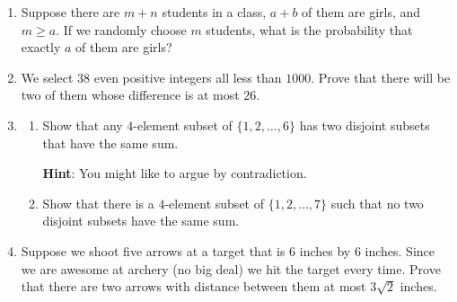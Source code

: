 \documentclass[11pt]{article}
\begin{document}
\begin{enumerate}
\item Suppose there are $m+n$ students in a class, $a+b$ of them are girls, and $m \ge a$.  If we randomly choose $m$ students, what is the probability that exactly $a$ of them are girls?

\item We select $38$ even positive integers all less than $1000$.  Prove that there will be two of them whose difference is at most $26$.

\item \begin{enumerate}
\item Show that any $4$-element subset of $\{1,2,\ldots, 6\}$ has two disjoint subsets that have the same sum. 

{\bf Hint}: You might like to argue by contradiction. 

\item Show that there is a $4$-element subset of $\{1,2,\ldots, 7\}$ such that no two disjoint subsets have the same sum.
\end{enumerate}

\item Suppose we shoot five arrows at a target that is $6$ inches by $6$ inches.  Since we are awesome at archery (no big deal) we hit the target every time.  Prove that there are two arrows with distance between them at most $3\sqrt{2}$ inches.



\end{enumerate}
\end{document}
